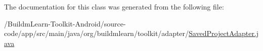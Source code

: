 The documentation for this class was generated from the following file\-:\begin{DoxyCompactItemize}
\item 
/\-Buildm\-Learn-\/\-Toolkit-\/\-Android/source-\/code/app/src/main/java/org/buildmlearn/toolkit/adapter/\hyperlink{SavedProjectAdapter_8java}{Saved\-Project\-Adapter.\-java}\end{DoxyCompactItemize}
